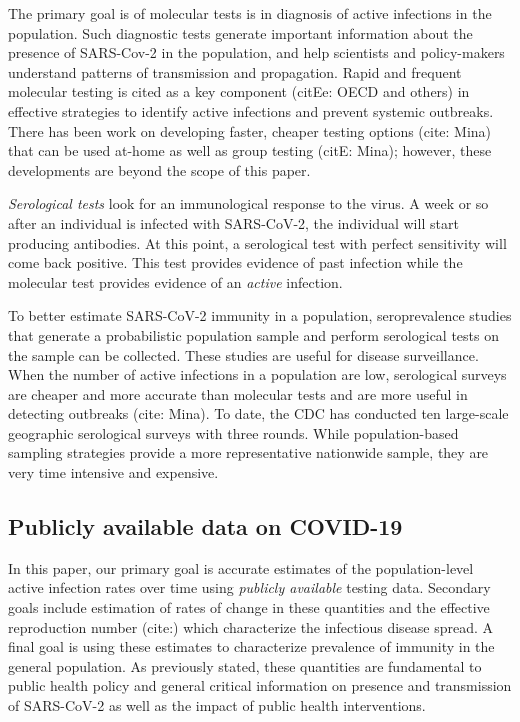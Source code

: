 \documentclass[11pt]{amsart}
\begin{document}
The primary goal is of molecular tests is in diagnosis of active infections in the population.  Such diagnostic tests generate important information about the presence of SARS-Cov-2 in the population, and help scientists and policy-makers understand patterns of transmission and propagation. Rapid and frequent molecular testing is cited as a key component (citEe: OECD and others) in effective strategies to identify active infections and prevent systemic outbreaks.  There has been work on developing faster, cheaper testing options (cite: Mina) that can be used at-home as well as group testing (citE: Mina); however, these developments are beyond the scope of this paper.

\emph{Serological tests} look for an immunological response to the virus.  A week or so after an individual is infected with SARS-CoV-2, the individual will start producing antibodies.  At this point, a serological test with perfect sensitivity will come back positive.  This test provides evidence of past infection while the molecular test provides evidence of an \emph{active} infection.

To better estimate SARS-CoV-2 immunity in a population, seroprevalence studies that generate a probabilistic population sample and perform serological tests on the sample can be collected.  These studies are useful for disease surveillance. When the number of active infections in a population are low, serological surveys are cheaper and more accurate than molecular tests and are more useful in detecting outbreaks (cite: Mina). To date, the CDC has conducted ten large-scale geographic serological surveys with three rounds.  While population-based sampling strategies provide a more representative nationwide sample, they are very time intensive and expensive.

\subsection{Publicly available data on COVID-19}
\label{section:testinginfo}

In this paper, our primary goal is accurate estimates of the population-level active infection rates over time using \emph{publicly available} testing data.  Secondary goals include estimation of rates of change in these quantities and the effective reproduction number (cite:) which characterize the infectious disease spread.  A final goal is using these estimates to characterize prevalence of immunity in the general population.  As previously stated, these quantities are fundamental to public health policy and general critical information on presence and transmission of SARS-CoV-2 as well as the impact of public health  interventions.
\end{document}
